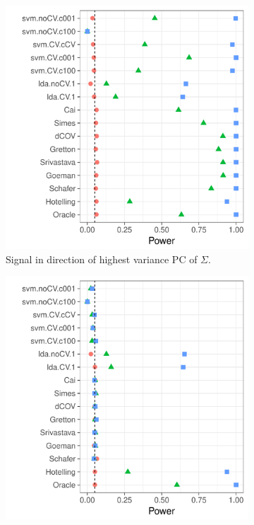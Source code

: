 \documentclass[oupdraft]{bio}
\begin{document}
\begin{figure}[h]
	\centering
	\begin{subfigure}[t]{.45\columnwidth}
		\centering
		\includegraphics[width=1\columnwidth]{"file18"}
		\caption{Signal in direction of highest variance PC of $\Sigma$.} 
		\label{fig:dependence_31}
	\end{subfigure}
	\begin{subfigure}[t]{.45\columnwidth}
		\centering
		\includegraphics[width=1\columnwidth]{"file17"}

\end{subfigure}
\end{figure}
\end{document}
